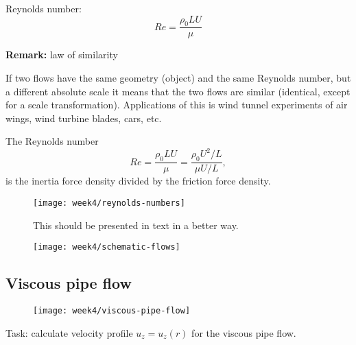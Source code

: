 Reynolds number:
\begin{equation}
Re = \frac{\rho_0 L U}{\mu}
\end{equation}

\begin{framed}
\textbf{Remark:} law of similarity

If two flows have the same geometry (object) and the same Reynolds number, but a different absolute scale it means that the two flows are similar (identical, except for a scale transformation). Applications of this is wind tunnel experiments of air wings, wind turbine blades, cars, etc.
\end{framed}

The Reynolds number
\begin{equation}
Re = \frac{\rho_0 L U}{\mu} = \frac{\rho_0 U^2/L}{\mu U/L},
\end{equation}
is the inertia force density divided by the friction force density.

\begin{figure}[p]
    \centering
    \texttt{[image: week4/reynolds-numbers]}\\
    \caption{This should be presented in text in a better way.}
    \label{fig:reynolds-numbers}
\end{figure}

\begin{figure}[p]
    \centering
    \texttt{[image: week4/schematic-flows]}\\
    \caption{}
    \label{fig:schematic-flows}
\end{figure}


\newpage
\subsection{Viscous pipe flow}

\begin{figure}[ht]
    \centering
    \texttt{[image: week4/viscous-pipe-flow]}\\
    \caption{}
    \label{fig:viscous-pipe-flow}
\end{figure}

Task: calculate velocity profile $u_z=u_z(r)$ for the viscous pipe flow.

